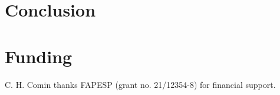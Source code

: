 \documentclass[%
reprint,
nofootinbib,
 amsmath,amssymb,
aps,
superscriptaddress,
showkeys,
longbibliography
]{revtex4-1}
\begin{document}


\section{Conclusion}
\label{s:conclusion}



\section*{Funding}
C. H. Comin thanks FAPESP (grant no. 21/12354-8) for financial support. 



\end{document}
